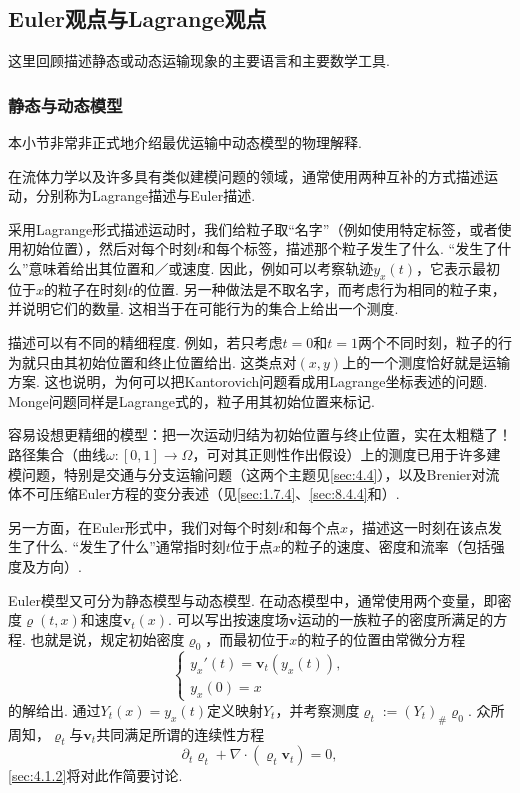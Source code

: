 \subsection{Euler观点与Lagrange观点}\label{sec:4.1}

这里回顾描述静态或动态运输现象的主要语言和主要数学工具.

\subsubsection{静态与动态模型}\label{sec:4.1.1}

本小节非常非正式地介绍最优运输中动态模型的物理解释.

在流体力学以及许多具有类似建模问题的领域，通常使用两种互补的方式描述运动，分别称为Lagrange描述与Euler描述.

采用Lagrange形式描述运动时，我们给粒子取“名字”（例如使用特定标签，或者使用初始位置），然后对每个时刻$t$和每个标签，描述那个粒子发生了什么. “发生了什么”意味着给出其位置和／或速度. 因此，例如可以考察轨迹$y_x(t)$，它表示最初位于$x$的粒子在时刻$t$的位置. 另一种做法是不取名字，而考虑行为相同的粒子束，并说明它们的数量. 这相当于在可能行为的集合上给出一个测度.

描述可以有不同的精细程度. 例如，若只考虑$t=0$和$t=1$两个不同时刻，粒子的行为就只由其初始位置和终止位置给出. 这类点对$(x,y)$上的一个测度恰好就是运输方案. 这也说明，为何可以把Kantorovich问题看成用Lagrange坐标表述的问题. Monge问题同样是Lagrange式的，粒子用其初始位置来标记.

容易设想更精细的模型：把一次运动归结为初始位置与终止位置，实在太粗糙了！路径集合（曲线$\omega:[0,1]\to\Omega$，可对其正则性作出假设）上的测度已用于许多建模问题，特别是交通与分支运输问题（这两个主题见\autoref{sec:4.4}），以及Brenier对流体不可压缩Euler方程的变分表述（见\autoref{sec:1.7.4}、\autoref{sec:8.4.4}和\cite{b51,b83,b85}）.

另一方面，在Euler形式中，我们对每个时刻$t$和每个点$x$，描述这一时刻在该点发生了什么. “发生了什么”通常指时刻$t$位于点$x$的粒子的速度、密度和流率（包括强度及方向）.

Euler模型又可分为静态模型与动态模型. 在动态模型中，通常使用两个变量，即密度$\varrho(t,x)$和速度$\mathbf v_t(x)$. 可以写出按速度场$\mathbf v$运动的一族粒子的密度所满足的方程. 也就是说，规定初始密度$\varrho_0$，而最初位于$x$的粒子的位置由常微分方程
\begin{equation}\label{eq:4.1}
 \begin{cases}
 y_x'(t)=\mathbf v_t(y_x(t)),\\
 y_x(0)=x
 \end{cases}
\end{equation}
的解给出. 通过$Y_t(x)=y_x(t)$定义映射$Y_t$，并考察测度$\varrho_t:=(Y_t)_\#\varrho_0$. \label{idx:root4-p122-continuity}众所周知，$\varrho_t$与$\mathbf v_t$共同满足所谓的连续性方程
\[
 \partial_t\varrho_t+\nabla\cdot(\varrho_t\mathbf v_t)=0,
\]
\autoref{sec:4.1.2}将对此作简要讨论.

